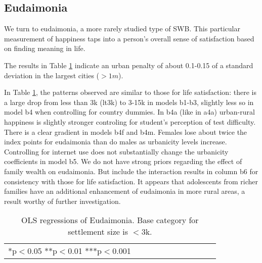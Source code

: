 \documentclass[10pt, letterpaper]{article}
\begin{document}
\begin{spacing}{1.4}
                                                       






\subsection*{Eudaimonia}

We turn to eudaimonia, a more rarely studied type of SWB. This particular measurement of happiness taps into a person's overall sense of satisfaction based on finding meaning in life. 

The results in Table \ref{regB} indicate an urban penalty of about 0.1-0.15 of a standard deviation in the largest cities ($>1m$).

 In Table \ref{regB}, the patterns observed are similar to those for life
 satisfaction: there is a large drop from less than 3k (lt3k) to 3-15k in models
 b1-b3, slightly less so
 in model b4 when controlling for country dummies. In b4a (like in a4a)
 urban-rural happiness is slightly stronger controling for student's perception
 of test difficulty. There is a clear gradient in
 models b4f and b4m. Females lose about twice the index points for eudaimonia
 than do males as urbanicity levels increase. 
Controlling for internet use does not substantially change  the urbanicity
coefficients in model b5. %
We do not
have strong priors regarding the effect of family wealth on eudaimonia. But include the interaction results in
column b6 %
 for consistency with those for life satisfaction. %
It appears that adolescents from richer families have an additional enhancement
of eudaimonia in more rural areas, a result worthy of further investigation.


\begin{table}[H]\centering\caption{OLS regressions of Eudaimonia. Base category for settlement size is $<$3k.} \label{regB} \begin{scriptsize} \begin{tabular}{p{1.6in}p{.5in}p{.5in}p{.5in}p{.5in}p{.5in}|p{.5in}p{.5in}|p{.5in}|p{.5in}p{.5in}p{.5 in}p{.5in}p{.5 in}}\hline  \hline\multicolumn{4}{l}{*p$<$0.05 **p$<$0.01 ***p$<$0.001} \end{tabular}\end{scriptsize}\end{table}




\end{spacing}
\end{document}
